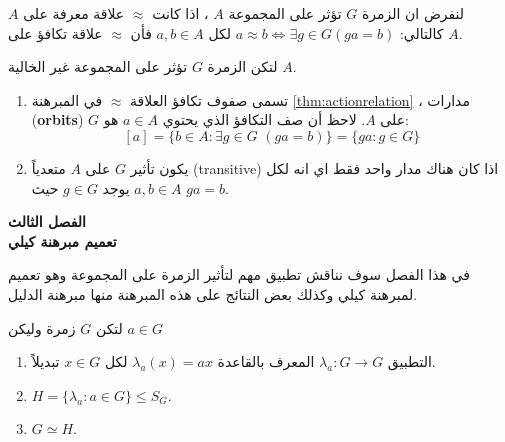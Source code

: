 		\begin{frame}
			\begin{theorem}\label{thm:actionrelation}
				لنفرض ان الزمرة $G$ تؤثر على المجموعة $A$ ، اذا كانت $\approx$ علاقة معرفة على $A$ كالتالي:\linebreak
				$a\approx b \iff \exists g\in G(ga= b)$ لكل $a, b\in A$ فأن $\approx$ علاقة تكافؤ على $A$.
			\end{theorem}
			\begin{definition}[{المدارات}]
				لتكن الزمرة $G$ تؤثر على المجموعة غير الخالية $A$.
				\begin{enumerate}
					\item تسمى صفوف تكافؤ العلاقة $\approx$ في المبرهنة \ref{thm:actionrelation} ، مدارات (\textbf{orbits}) $G$ على $A$.
					\linebreak لاحظ أن صف التكافؤ الذي يحتوي $a\in A$ هو:
					\[
					[a] = \{ b\in A : \exists g\in G \,\,( ga = b)\} = \{ga : g\in G\}
					\]
					\item يكون تأثير $G$ على $A$ متعدياً (transitive) اذا كان هناك مدار واحد فقط اي انه لكل $a, b\in A$ يوجد $g\in G$ حيث 
					$ga=b$.
				\end{enumerate}
			\end{definition}
		\end{frame}
		
		\begin{frame}
			\begin{center}
				\Huge
				\textbf{الفصل الثالث}\\
				\textbf{تعميم مبرهنة كيلي}
			\end{center}
		\end{frame}
		
		\begin{frame}
			في هذا الفصل سوف نناقش تطبيق مهم لتأثير الزمرة على المجموعة وهو تعميم لمبرهنة كيلي وكذلك بعض النتائج على هذه المبرهنة منها مبرهنة الدليل.
			
			\begin{theorem}
				لتكن $G$ زمرة وليكن $a\in G$
				\begin{enumerate}[label=(\alph*)]
					\item التطبيق $\lambda_a : G \to G$ المعرف بالقاعدة $\lambda_a(x) = ax$ لكل $x\in G$ تبديلاً.
					
					\item $H = \{\lambda_a : a\in G\} \le S_G$.
					
					\item $G \simeq H$.  
				\end{enumerate}
			\end{theorem}
		\end{frame}
		
